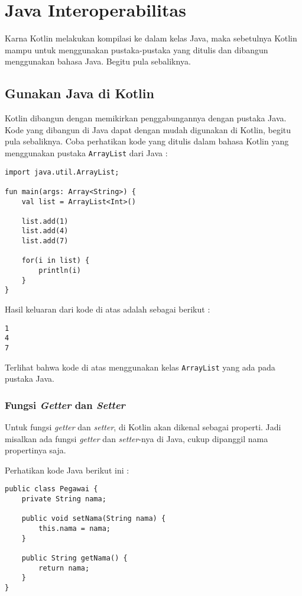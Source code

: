 \chapter{Java Interoperabilitas}

Karna Kotlin melakukan kompilasi ke dalam kelas Java, maka sebetulnya Kotlin mampu untuk menggunakan pustaka-pustaka yang ditulis dan dibangun menggunakan bahasa Java. Begitu pula sebaliknya.

\section{Gunakan Java di Kotlin}

Kotlin dibangun dengan memikirkan penggabungannya dengan pustaka Java. Kode yang dibangun di Java dapat dengan mudah digunakan di Kotlin, begitu pula sebaliknya. Coba perhatikan kode yang ditulis dalam bahasa Kotlin yang menggunakan pustaka \texttt{ArrayList} dari Java :

\begin{lstlisting}
import java.util.ArrayList;

fun main(args: Array<String>) {
	val list = ArrayList<Int>()
	
	list.add(1)
	list.add(4)
	list.add(7)
	
	for(i in list) {
		println(i)
	}
}
\end{lstlisting}

Hasil keluaran dari kode di atas adalah sebagai berikut :

\begin{lstlisting}
1
4
7
\end{lstlisting}

Terlihat bahwa kode di atas menggunakan kelas \texttt{ArrayList} yang ada pada pustaka Java.

\subsection{Fungsi \textit{Getter} dan \textit{Setter}}

Untuk fungsi \textit{getter} dan \textit{setter}, di Kotlin akan dikenal sebagai properti. Jadi misalkan ada fungsi \textit{getter} dan \textit{setter}-nya di Java, cukup dipanggil nama propertinya saja.

Perhatikan kode Java berikut ini :

\begin{lstlisting}
public class Pegawai {
	private String nama;
	
	public void setNama(String nama) {
		this.nama = nama;
	}
	
	public String getNama() {
		return nama;
	}
}
\end{lstlisting}

